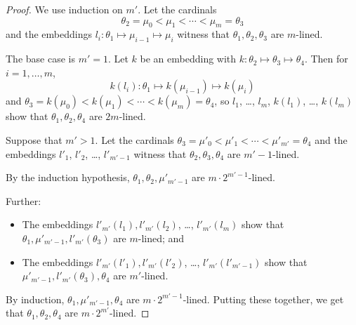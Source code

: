 \documentclass{article}
\theoremstyle{definition}
\theoremstyle{remark}
\begin{document}
\begin{proof}
  We use induction on $m'$. Let the cardinals 
  \[
     \theta_2 = \mu_0 < \mu_1 < \cdots < \mu_m = \theta_3
   \]
   and the embeddings $l_i : \theta_1\mapsto \mu_{i-1}\mapsto \mu_i$ witness that $\theta_1,\theta_2,\theta_3$ are $m$-lined. 

   \smallskip

  The base case is $m'=1$. Let $k$ be an embedding with $k:\theta_2\mapsto \theta_3\mapsto \theta_4$. Then for $i=1,\dots, m$, 
   \[
   k(l_i): \theta_1\mapsto k(\mu_{i-1})\mapsto k(\mu_i)
   \]
   and $\theta_3 = k(\mu_0) < k(\mu_1) < \cdots < k(\mu_m) = \theta_4$, so $l_1$, \dots, $l_m$, $k(l_1)$, \dots, $k(l_m)$ show that $\theta_1,\theta_2,\theta_4$ are $2m$-lined. 

  \smallskip

  Suppose that $m'>1$. Let the cardinals $\theta_3  = \mu'_0 < \mu'_1 < \cdots < \mu'_{m'} = \theta_4$ and the embeddings $l'_1$, $l'_2$, \dots, $l'_{m'-1}$ witness that $\theta_2,\theta_3,\theta_4$ are $m'-1$-lined. 

  By the induction hypothesis, $\theta_1,\theta_2,\mu'_{m'-1}$ are $m\cdot 2^{m'-1}$-lined. 

  Further:
  \begin{itemize}
    \item The embeddings $l'_{m'}(l_1), l'_{m'}(l_2)$, \dots, $l'_{m'}(l_m)$ show that $\theta_1,\mu'_{m'-1}, l'_{m'}(\theta_3)$ are $m$-lined; and
    \item The embeddings $l'_{m'}(l'_1), l'_{m'}(l'_2)$, \dots, $l'_{m'}(l'_{m'-1})$ show that $\mu'_{m'-1}, l'_{m'}(\theta_3),\theta_4$ are $m'$-lined. 
  \end{itemize}
  By induction, $\theta_1,\mu'_{m'-1}, \theta_4$ are $m\cdot 2^{m'-1}$-lined. Putting these together, we get that $\theta_1,\theta_2,\theta_4$ are $m\cdot 2^{m'}$-lined. 
\end{proof}
\end{document}
